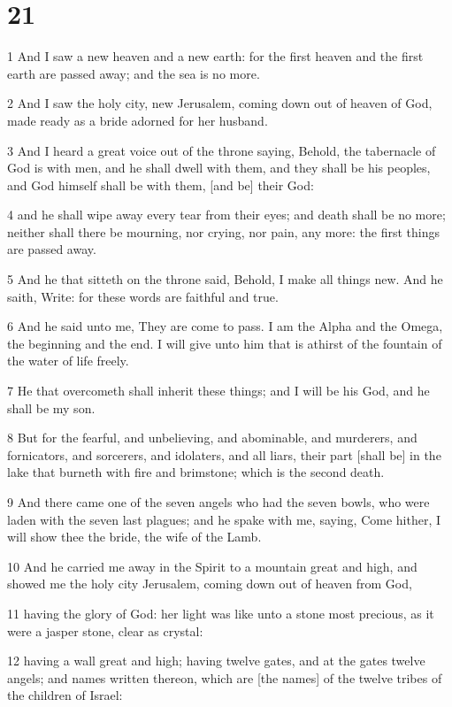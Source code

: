 \chapter{21}

\par 1 And I saw a new heaven and a new earth: for the first heaven and the first earth are passed away; and the sea is no more.
\par 2 And I saw the holy city, new Jerusalem, coming down out of heaven of God, made ready as a bride adorned for her husband.
\par 3 And I heard a great voice out of the throne saying, Behold, the tabernacle of God is with men, and he shall dwell with them, and they shall be his peoples, and God himself shall be with them, [and be] their God:
\par 4 and he shall wipe away every tear from their eyes; and death shall be no more; neither shall there be mourning, nor crying, nor pain, any more: the first things are passed away.
\par 5 And he that sitteth on the throne said, Behold, I make all things new. And he saith, Write: for these words are faithful and true.
\par 6 And he said unto me, They are come to pass. I am the Alpha and the Omega, the beginning and the end. I will give unto him that is athirst of the fountain of the water of life freely.
\par 7 He that overcometh shall inherit these things; and I will be his God, and he shall be my son.
\par 8 But for the fearful, and unbelieving, and abominable, and murderers, and fornicators, and sorcerers, and idolaters, and all liars, their part [shall be] in the lake that burneth with fire and brimstone; which is the second death.
\par 9 And there came one of the seven angels who had the seven bowls, who were laden with the seven last plagues; and he spake with me, saying, Come hither, I will show thee the bride, the wife of the Lamb.
\par 10 And he carried me away in the Spirit to a mountain great and high, and showed me the holy city Jerusalem, coming down out of heaven from God,
\par 11 having the glory of God: her light was like unto a stone most precious, as it were a jasper stone, clear as crystal:
\par 12 having a wall great and high; having twelve gates, and at the gates twelve angels; and names written thereon, which are [the names] of the twelve tribes of the children of Israel:
